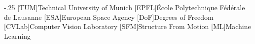 \documentclass[headsepline,footsepline,footinclude=false,oneside,fontsize=10pt,paper=a4,listof=totoc,bibliography=totoc]{scrbook} %
\begin{document}


\frontmatter{}

%
%



\tableofcontents{}

\mainmatter{}









\frontmatter{}
\setcounter{page}{4}


\begin{acronym}
	\itemsep-.25\baselineskip
	[TUM]{Technical University of Munich}
	[EPFL]{École Polytechnique Fédérale de Lausanne}
	[ESA]{European Space Agency}
	[DoF]{Degrees of Freedom}
	[CVLab]{Computer Vision Laboratory}
	[SFM]{Structure From Motion}
	[ML]{Machine Learning}
\end{acronym}

\cleardoublepage{}



\printbibliography{}
\end{document}
